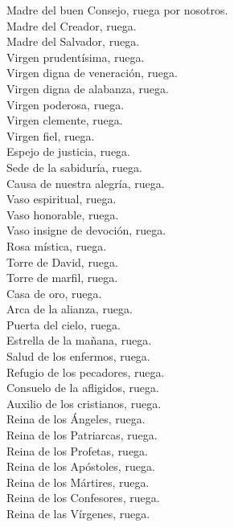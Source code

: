 \documentclass[10pt,a4paper,oneside]{book}
\begin{document}
\begin{minipage}[t]{0.475\textwidth}
      Madre del buen Consejo, ruega por nosotros.\\
      Madre del Creador, ruega.\\
      Madre del Salvador, ruega.\\
      Virgen prudentísima, ruega.\\
      Virgen digna de veneración, ruega.\\
      Virgen digna de alabanza, ruega.\\
      Virgen poderosa, ruega.\\
      Virgen clemente, ruega.\\
      Virgen fiel, ruega.\\
      Espejo de justicia, ruega.\\
      Sede de la sabiduría, ruega.\\
      Causa de nuestra alegría, ruega.\\
      Vaso espiritual, ruega.\\
      Vaso honorable, ruega.\\
      Vaso insigne de devoción, ruega.\\
      Rosa mística, ruega.\\
      Torre de David, ruega.\\
      Torre de marfil, ruega.\\
      Casa de oro, ruega.\\
      Arca de la alianza, ruega.\\
      Puerta del cielo, ruega.\\
      Estrella de la mañana, ruega.\\
      Salud de los enfermos, ruega.\\
      Refugio de los pecadores, ruega.\\
      Consuelo de la afligidos, ruega.\\
      Auxilio de los cristianos, ruega.\\
      Reina de los Ángeles, ruega.\\
      Reina de los Patriarcas, ruega.\\
      Reina de los Profetas, ruega.\\
      Reina de los Apóstoles, ruega.\\
      Reina de los Mártires, ruega.\\
      Reina de los Confesores, ruega.\\
      Reina de las Vírgenes, ruega.\\

\end{minipage}
\end{document}
